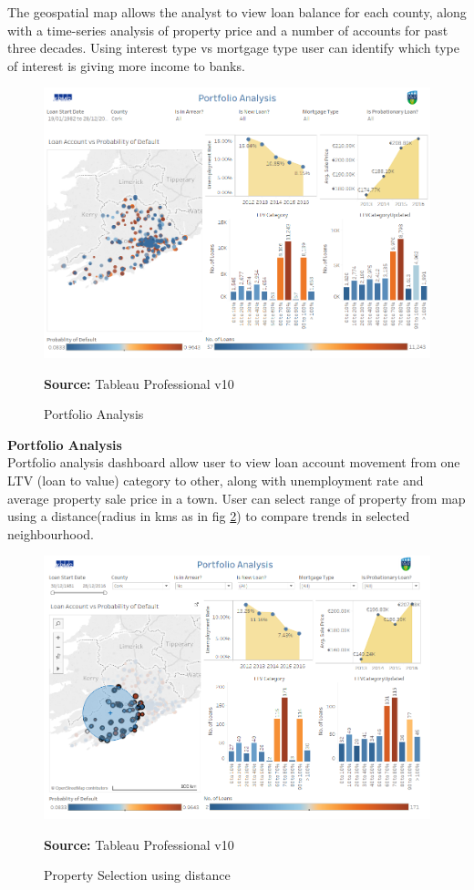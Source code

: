 The geospatial map allows the analyst to view loan balance for each county, along with a time-series analysis of property price and a number of accounts for past three decades. Using interest type vs mortgage type user can identify which type of interest is giving more income to banks.

\begin{center}
\begin{figure}[!htb]
\includegraphics[width=\textwidth]{Analysis.png}
\centering
\caption{Portfolio Analysis}{\textbf{Source:} Tableau Professional v10}
\label{fig:overview}
\end{figure}
\end{center}
\textbf{Portfolio Analysis}\\
Portfolio analysis dashboard allow user to view loan account movement from one LTV (loan to value) category to other, along with unemployment rate and average property sale price in a town. User can select range of property from map using a distance(radius in kms as in fig \ref{fig:dist}) to compare trends in selected neighbourhood.

\begin{center}
\begin{figure}[!htb]
\includegraphics[width=\textwidth]{dist.png}
\centering
\caption{Property Selection using distance}{\textbf{Source:} Tableau Professional v10}
\label{fig:dist}
\end{figure}
\end{center}


